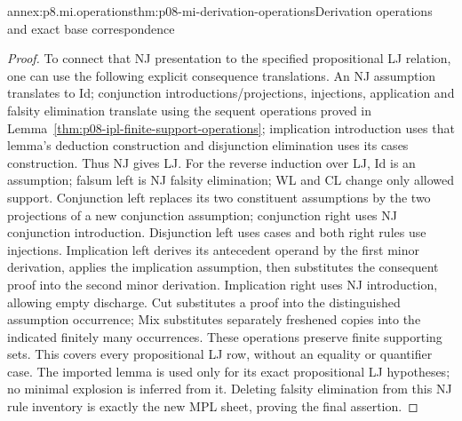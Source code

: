 \begin{annexitem}{annex:p8.mi.operations}{thm:p08-mi-derivation-operations}{Derivation operations and exact base correspondence}
\begin{proof}
To connect that NJ presentation to the specified propositional LJ relation,
one can use the following explicit consequence translations. An NJ
assumption translates to Id; conjunction introductions/projections,
injections, application and falsity elimination translate using the
sequent operations proved in
Lemma~\ref{thm:p08-ipl-finite-support-operations}; implication introduction
uses that lemma's deduction construction and disjunction elimination uses
its cases construction. Thus NJ gives LJ. For the reverse induction over
LJ, Id is an assumption; falsum left is NJ falsity elimination; WL and CL
change only allowed support. Conjunction left replaces its two constituent
assumptions by the two projections of a new conjunction assumption;
conjunction right uses NJ conjunction introduction. Disjunction left
uses cases and both right rules use injections. Implication left derives
its antecedent operand by the first minor derivation, applies the
implication assumption, then substitutes the consequent proof into the
second minor derivation. Implication right uses NJ introduction, allowing
empty discharge. Cut substitutes a proof into the distinguished
assumption occurrence; Mix substitutes separately freshened copies into
the indicated finitely many occurrences. These operations preserve
finite supporting sets. This covers every propositional LJ row, without
an equality or quantifier case. The imported lemma is used only for its
exact propositional LJ hypotheses; no minimal explosion is inferred from it.
Deleting falsity elimination from this NJ rule inventory is exactly the
new MPL sheet, proving the final assertion.
\end{proof}
\end{annexitem}


